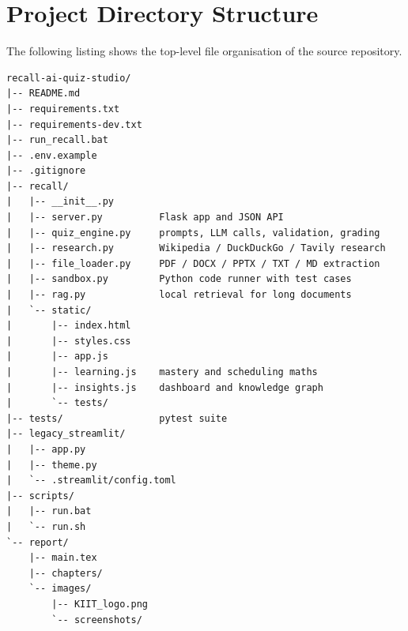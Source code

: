 \chapter{Project Directory Structure}
The following listing shows the top-level file organisation of the source repository.

\begin{lstlisting}[basicstyle=\ttfamily\footnotesize, caption={Repository directory tree}, label={lst:dir-tree}]
recall-ai-quiz-studio/
|-- README.md
|-- requirements.txt
|-- requirements-dev.txt
|-- run_recall.bat
|-- .env.example
|-- .gitignore
|-- recall/
|   |-- __init__.py
|   |-- server.py          Flask app and JSON API
|   |-- quiz_engine.py     prompts, LLM calls, validation, grading
|   |-- research.py        Wikipedia / DuckDuckGo / Tavily research
|   |-- file_loader.py     PDF / DOCX / PPTX / TXT / MD extraction
|   |-- sandbox.py         Python code runner with test cases
|   |-- rag.py             local retrieval for long documents
|   `-- static/
|       |-- index.html
|       |-- styles.css
|       |-- app.js
|       |-- learning.js    mastery and scheduling maths
|       |-- insights.js    dashboard and knowledge graph
|       `-- tests/
|-- tests/                 pytest suite
|-- legacy_streamlit/
|   |-- app.py
|   |-- theme.py
|   `-- .streamlit/config.toml
|-- scripts/
|   |-- run.bat
|   `-- run.sh
`-- report/
    |-- main.tex
    |-- chapters/
    `-- images/
        |-- KIIT_logo.png
        `-- screenshots/
\end{lstlisting}
